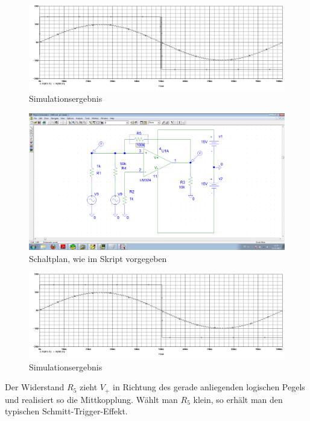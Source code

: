 \begin{figure}[H]
	\centering
	\includegraphics[width=\linewidth]{versuch6/spice/642.png}
	\caption{Simulationsergebnis}
\end{figure}
\begin{figure}[H]
	\centering
	\includegraphics[width=\linewidth]{versuch6/spice/schem643.png}
	\caption{Schaltplan, wie im Skript vorgegeben}
\end{figure}
\begin{figure}[H]
	\centering
	\includegraphics[width=\linewidth]{versuch6/spice/643.png}
	\caption{Simulationsergebnis}
\end{figure}
Der Widerstand $ R_5 $ zieht $ V_+ $ in Richtung des gerade anliegenden logischen Pegels und realisiert so die Mittkopplung. Wählt man $ R_5 $ klein, so erhält man den typischen Schmitt-Trigger-Effekt.%

